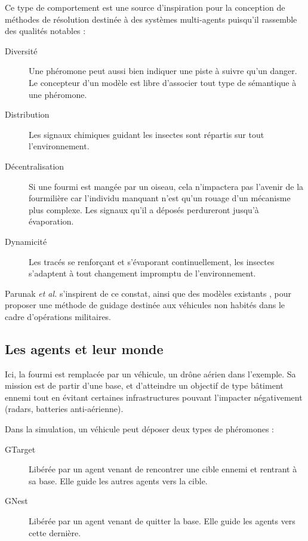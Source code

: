 \documentclass[12pt]{article}
\begin{document}
Ce type de comportement est une source d'inspiration pour la
conception de méthodes de résolution destinée à des systèmes
multi-agents puisqu'il rassemble des qualités notables
\cite{parunak} :

\begin{description}
\item[Diversité]{Une phéromone peut aussi bien indiquer une piste à suivre qu'un danger. Le concepteur d'un modèle est libre d'associer tout type de sémantique à une phéromone.}
  \item[Distribution]{Les signaux chimiques guidant les insectes sont répartis
sur tout l'environnement.}
  \item[Décentralisation]{Si une fourmi est mangée par un oiseau, cela
  n'impactera pas l'avenir de la fourmilière car l'individu manquant
  n'est qu'un rouage d'un mécanisme plus complexe. Les signaux qu'il a déposés perdureront jusqu'à évaporation.}
  \item[Dynamicité]{Les tracés se renforçant et s'évaporant continuellement, les insectes
s'adaptent à tout changement impromptu de l'environnement.}
\end{description}

Parunak \textit{et al.} s'inspirent de ce constat, ainsi que des
modèles existants \cite{dorigo}, pour proposer une méthode de guidage
destinée aux véhicules non habités dans le cadre
d'opérations militaires.

\subsection{Les agents et leur monde}

Ici, la fourmi est remplacée par un véhicule, un drône aérien dans l'exemple. Sa mission
est de partir d'une base, et d'atteindre un objectif de type bâtiment ennemi tout en évitant
certaines infrastructures pouvant l'impacter négativement (radars, batteries anti-aérienne).

Dans la simulation, un véhicule peut déposer deux types de phéromones :

\begin{description}
  \item[GTarget]{Libérée par un agent venant de rencontrer une cible ennemi et rentrant à sa base. Elle guide les autres agents vers la cible.}
  \item[GNest]{Libérée par un agent venant de quitter la base. Elle guide les agents vers cette dernière.}
\end{description}
\end{document}

